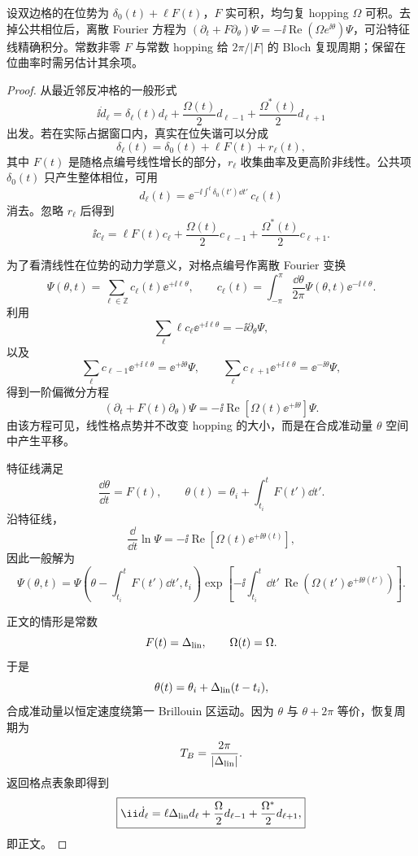 \begin{proposition}
设双边格的在位势为 $\delta_0(t)+\ell F(t)$，$F$ 实可积，均匀复 hopping $\Omega$ 可积。去掉公共相位后，离散 Fourier 方程为 $(\partial_t+F\partial_\theta)\Psi=-\ii\operatorname{Re}(\Omega e^{\ii\theta})\Psi$，可沿特征线精确积分。常数非零 $F$ 与常数 hopping 给 $2\pi/|F|$ 的 Bloch 复现周期；保留在位曲率时需另估计其余项。
\end{proposition}
\begin{proof}
从最近邻反冲格的一般形式
\[
\ii\dot d_\ell
=
\delta_\ell(t)d_\ell
+\frac{\Omega(t)}{2}d_{\ell-1}
+\frac{\Omega^*(t)}{2}d_{\ell+1}
\]
出发。若在实际占据窗口内，真实在位失谐可以分成
\[
\delta_\ell(t)
=
\delta_0(t)+\ell F(t)+r_\ell(t),
\]
其中 $F(t)$ 是随格点编号线性增长的部分，$r_\ell$ 收集曲率及更高阶非线性。公共项 $\delta_0(t)$ 只产生整体相位，可用
\[
d_\ell(t)
=
\ee^{-\ii\int^t\delta_0(t')\dd t'}\,c_\ell(t)
\]
消去。忽略 $r_\ell$ 后得到
\[
\ii\dot c_\ell
=
\ell F(t)c_\ell
+\frac{\Omega(t)}2c_{\ell-1}
+\frac{\Omega^*(t)}2c_{\ell+1}.
\]

为了看清线性在位势的动力学意义，对格点编号作离散 Fourier 变换
\[
\Psi(\theta,t)
=
\sum_{\ell\in\mathbb Z}
c_\ell(t)\ee^{+\ii\ell\theta},
\qquad
c_\ell(t)
=
\int_{-\pi}^{\pi}\frac{\dd\theta}{2\pi}
\Psi(\theta,t)\ee^{-\ii\ell\theta}.
\]
利用
\[
\sum_\ell \ell c_\ell\ee^{+\ii\ell\theta}
=
-\ii\partial_\theta\Psi,
\]
以及
\[
\sum_\ell c_{\ell-1}\ee^{+\ii\ell\theta}
=
\ee^{+\ii\theta}\Psi,
\qquad
\sum_\ell c_{\ell+1}\ee^{+\ii\ell\theta}
=
\ee^{-\ii\theta}\Psi,
\]
得到一阶偏微分方程
\[
\left(
\partial_t+F(t)\partial_\theta
\right)\Psi
=
-\ii
\operatorname{Re}
\!\left[
\Omega(t)\ee^{+\ii\theta}
\right]\Psi.
\]
由该方程可见，线性格点势并不改变 hopping 的大小，而是在合成准动量 $\theta$ 空间中产生平移。

特征线满足
\[
\frac{\dd\theta}{\dd t}
=
F(t),
\qquad
\theta(t)
=
\theta_i+\int_{t_i}^{t}F(t')\dd t'.
\]
沿特征线，
\[
\frac{\dd}{\dd t}
\ln\Psi
=
-\ii
\operatorname{Re}
\!\left[
\Omega(t)\ee^{+\ii\theta(t)}
\right],
\]
因此一般解为
\[
\Psi(\theta,t)
=
\Psi\!\left(
\theta-\int_{t_i}^{t}F(t')\dd t',
t_i
\right)
\exp\!\left[
-\ii
\int_{t_i}^{t}\dd t'\,
\operatorname{Re}
\!\left(
\Omega(t')\ee^{+\ii\theta(t')}
\right)
\right].
\]

正文的情形是常数
\[
F(t)=\Delta_{\rm lin},
\qquad
\Omega(t)=\Omega.
\]
于是
\[
\theta(t)
=
\theta_i+\Delta_{\rm lin}(t-t_i),
\]
合成准动量以恒定速度绕第一 Brillouin 区运动。因为 $\theta$ 与 $\theta+2\pi$ 等价，恢复周期为
\[
T_B
=
\frac{2\pi}{|\Delta_{\rm lin}|}.
\]
返回格点表象即得到
\[
\boxed{
\ii\dot d_\ell
=
\ell\Delta_{\rm lin}d_\ell
+\frac{\Omega}{2}d_{\ell-1}
+\frac{\Omega^*}{2}d_{\ell+1},
}
\]
即正文。
\end{proof}


